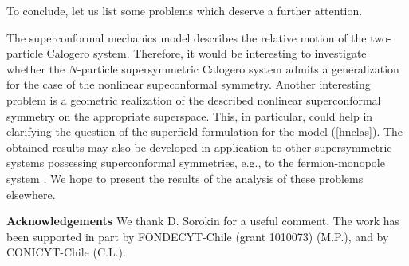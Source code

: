 \documentclass[a4paper,12pt]{article}
\begin{document}
To conclude, let us
list some problems which deserve a
further attention.

The superconformal mechanics model
describes the relative motion of the two-particle
Calogero system.
Therefore, it
would be interesting to investigate
whether the $N$-particle
supersymmetric Calogero system
\cite{FM,GT,Wyl,bgk}
admits a generalization for the case
of the nonlinear supeconformal symmetry.
Another interesting problem is a geometric
realization of the described nonlinear superconformal
symmetry on the appropriate superspace.
This, in particular, could help in clarifying
the question of
the superfield formulation for the model
(\ref{hnclas}).
The obtained results may also be
developed in application
to other supersymmetric
systems possessing superconformal symmetries,
e.g., to the fermion-monopole system \cite{HL,PMF}.
We hope to present the results of the analysis
of these problems elsewhere.



\vskip 0.5cm
{\bf Acknowledgements}
\vskip 5mm
We  thank D. Sorokin for a useful comment.
The work has been supported in part by
FONDECYT-Chile (grant 1010073) (M.P.),
and by CONICYT-Chile (C.L.).
\end{document}
